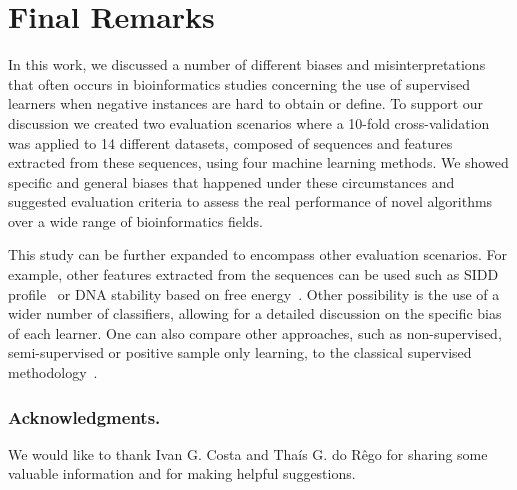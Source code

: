 \documentclass[runningheads,a4paper]{llncs}
\begin{document}
\section{Final Remarks}

In this work, we discussed a number of different biases and misinterpretations that often occurs in bioinformatics studies concerning the use of supervised learners when negative instances are hard to obtain or define. To support our discussion we created two evaluation scenarios where a 10-fold cross-validation was applied to 14 different datasets, composed of sequences and features extracted from these sequences, using four machine learning methods. We showed specific and general biases that happened under these circumstances and suggested evaluation criteria to assess the real performance of novel algorithms over a wide range of bioinformatics fields.

This study can be further expanded to encompass other evaluation scenarios. For example, other features extracted from the sequences can be used such as SIDD profile~\cite{bland2010} or DNA stability based on free energy~\cite{avila2011}. Other possibility is the use of a wider number of classifiers, allowing for a detailed discussion on the specific bias of each learner. One can also compare other approaches, such as non-supervised, semi-supervised or positive sample only learning,  to the classical supervised methodology~\cite{cerulo2010,wang2006,yousef2008}.


\subsubsection*{Acknowledgments.} We would like to thank Ivan G. Costa and Tha\'{i}s G. do R\^{e}go for sharing some valuable information and for making helpful suggestions.
\end{document}

